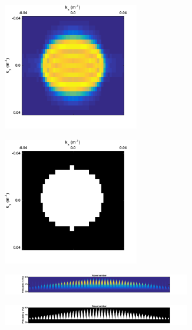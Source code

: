 \begin{figure}
	\centering
	\begin{subfigure}[t]{0.45\textwidth}
		\centering
		\includegraphics[width=0.65\textwidth]{Plots/IdealData3d/P_f_slice40}
		\caption{}
		\label{fig:Ch-Theory-FK-f_slice-data}
	\end{subfigure}
	\centering
	\begin{subfigure}[t]{0.45\textwidth}
		\centering
		\includegraphics[width=0.65\textwidth]{Plots/IdealData3d/fkk-mask-slice40}
		\caption{}
		\label{fig:Ch-Theory-FK-f_slice-mask}
	\end{subfigure}
	
	\begin{subfigure}[t]{\textwidth}
		\centering
		\includegraphics[width=0.9\textwidth]{Plots/IdealData3d/P_fkk_Delphi}
		\caption{}
		\label{fig:Ch-Theory-FK-delphi-data}
	\end{subfigure}
	\par\bigskip
	\begin{subfigure}[t]{\textwidth}
		\centering
		\includegraphics[width=0.9\textwidth]{Plots/IdealData3d/fkk-mask-Delphi}
		\caption{}
		\label{fig:Ch-Theory-FK-delphi-mask}
	\end{subfigure}
	

\end{figure}
